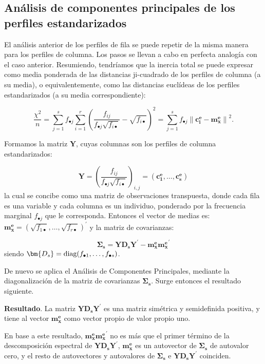 \documentclass[
  a4paper,
  oneside]{scrbook}
\theoremstyle{definition}
\theoremstyle{definition}
\theoremstyle{definition}
\theoremstyle{definition}
\theoremstyle{remark}
\begin{document}
\subsection{Análisis de componentes principales de los perfiles estandarizados}\label{analisis-de-componentes-principales-de-los-perfiles-estandarizados-2}

El análisis anterior de los perfiles de fila se puede repetir de la
misma manera para los perfiles de columna. Los pasos se llevan a cabo en
perfecta analogía con el caso anterior. Resumiendo, tendríamos que la
inercia total se puede expresar como media ponderada de las distancias
ji-cuadrado de los perfiles de columna (a su media), o equivalentemente,
como las distancias euclídeas de los perfiles estandarizados (a su media
correspondiente):

\[\frac{\chi^2}{n}
=\sum_{j=1}^s f_{\bullet j} \sum_{i=1}^r
\left(\frac{f_{ij}}{f_{\bullet j}\sqrt{f_{i \bullet}}}-\sqrt{f_{i \bullet}}\right)^2
=\sum_{j=1}^s f_{\bullet j} \left\|\bm{c_i^e}-\bm{m_x^e}\right\|^2.\]

Formamos la matriz \(\bm{Y}\), cuyas columnas son los perfiles de columna
estandarizados:

\[\bm{Y}=\left(\frac{f_{ij}}{f_{\bullet j}\sqrt{f_{i \bullet}}}\right)_{i,j}
=\left( \bm{c_1^e}, \ldots,  \bm{c_s^e} \right)\] la cual se concibe
como una matriz de observaciones transpuesta, donde cada fila es una
variable y cada columna es un individuo, ponderado por la frecuencia
marginal \(f_{\bullet j}\) que le corresponda. Entonces el vector de
medias es:
\(\bm{m_x^e}=\left(\sqrt{f_{1 \bullet}},\ldots,\sqrt{f_{r \bullet}}\right)^{\prime}\)
y la matriz de covarianzas:

\[\bm{\Sigma_s}=\bm{Y D_s Y^{\prime}} - \bm{m_x^e} {\bm{m_x^e}}^{\prime}\]
siendo \(\bm{D_s}=\textnormal{diag}(f_{\bullet 1},\ldots,f_{\bullet s})\).

De nuevo se aplica el Análisis de Componentes Principales, mediante la
diagonalización de la matriz de covarianzas \(\bm{\Sigma_s}\). Surge
entonces el resultado siguiente.

\textbf{Resultado}. La matriz \(\bm{Y D_s Y^{\prime}}\) es una matriz simétrica
y semidefinida positiva, y tiene al vector \(\bm{m_x^e}\) como vector
propio de valor propio uno.

En base a este resultado, \(\bm{m_x^e}{\bm{m_x^e}}^{\prime}\) no es más
que el primer término de la descomposición espectral de
\(\bm{Y D_s Y^{\prime}}\), \(\bm{m_x^e}\) es un autovector de
\(\bm{\Sigma_s}\) de autovalor cero, y el resto de autovectores y
autovalores de \(\bm{\Sigma_s}\) e \(\bm{Y D_s Y^{\prime}}\) coinciden.
\end{document}
